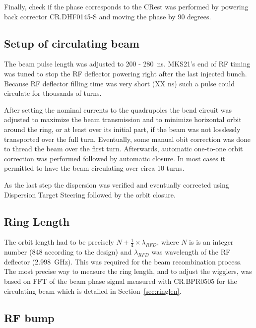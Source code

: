 Finally, check if the phase corresponds to the \ac{CR}est was performed
by powering back corrector CR.DHF0145-S and moving the phase by 90 degrees.



\subsection{Setup of circulating beam}

The beam pulse length was adjusted to 200 - 280~ns. 
MKS21's end of RF timing was tuned to stop the RF deflector powering right 
after the last injected bunch. Because RF deflector filling time 
was very short (XX ns) 
such a pulse could circulate for thousands of turns.

After setting the nominal currents to the quadrupoles the bend circuit 
was adjusted to maximize the beam transmission and 
to minimize horizontal orbit around the ring, or 
at least over its initial part, if the beam was not losslessly transported 
over the full turn. Eventually, some manual obit correction was done to thread 
the beam over the first turn.
Afterwards, automatic one-to-one orbit correction was performed followed by
automatic closure. In most cases it permitted to have the beam circulating over 
circa 10 turns. 

As the last step the dispersion was verified and eventually corrected using 
Dispersion Target Steering followed by the orbit closure.

\subsection{Ring Length}

The orbit length had to be precisely $N+\frac{1}{4}\times \lambda_{RFD}$, 
where $N$ is is an integer number (848 according to the design) and 
$\lambda_{RFD}$ was wavelength of the RF deflector (2.998~GHz).
This was required for the beam recombination process. The most precise way to measure 
the ring length, and to adjust the wigglers, was based on FFT of the beam phase signal
measured with CR.BPR0505 for the circulating beam which is detailed in Section~\ref{sec:ringlen}.


\subsection{RF bump}

